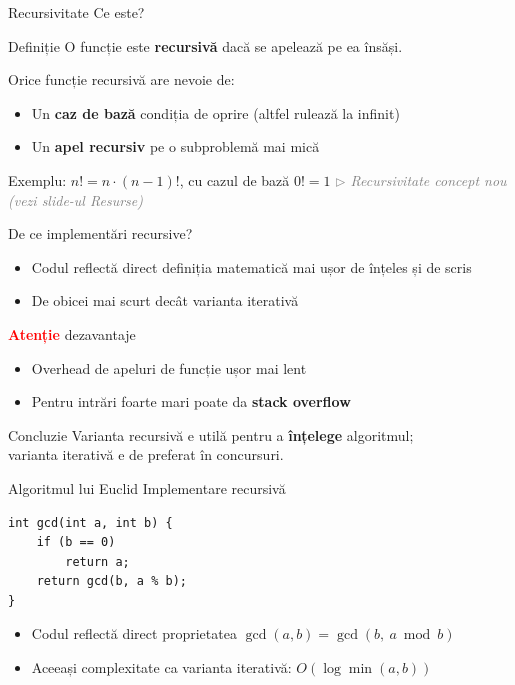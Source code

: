 ﻿\documentclass{beamer}
\newcommand{\beginnote}[1]{%
  \vfill
  {\footnotesize\textcolor{gray}{\textit{$\triangleright$ #1 (vezi slide-ul \emph{Resurse})}}}%
}
\begin{document}
\begin{frame}{Recursivitate \textemdash{} Ce este?}
  \begin{block}{Definiție}
    O funcție este \textbf{recursivă} dacă se apelează pe ea însăși.
  \end{block}
  \bigskip
  Orice funcție recursivă are nevoie de:
  \begin{itemize}
    \item Un \textbf{caz de bază} \textemdash{} condiția de oprire (altfel rulează la infinit)
    \item Un \textbf{apel recursiv} pe o subproblemă mai mică
  \end{itemize}
  \bigskip
  Exemplu: $n! = n \cdot (n-1)!$, cu cazul de bază $0! = 1$
  \beginnote{Recursivitate \textemdash{} concept nou}
\end{frame}

\begin{frame}{De ce implementări recursive?}
  \begin{itemize}
    \item Codul reflectă direct definiția matematică \textemdash{} mai ușor de înțeles și de scris
    \item De obicei mai scurt decât varianta iterativă
  \end{itemize}
  \medskip
  \begin{block}{\textbf{\textcolor{red}{Atenție}} \textemdash{} dezavantaje}
    \begin{itemize}
      \item Overhead de apeluri de funcție \textemdash{} ușor mai lent
      \item Pentru intrări foarte mari poate da \textbf{stack overflow}
    \end{itemize}
  \end{block}
  \medskip
  \begin{block}{Concluzie}
    Varianta recursivă e utilă pentru a \textbf{înțelege} algoritmul; \\ varianta iterativă e de preferat în concursuri.
  \end{block}
\end{frame}

\begin{frame}{Algoritmul lui Euclid \textemdash{} Implementare recursivă}
  \begin{center}
  \begin{lstlisting}
int gcd(int a, int b) {
    if (b == 0)
        return a;
    return gcd(b, a % b);
}
  \end{lstlisting}
  \end{center}
  \bigskip
  \begin{itemize}
    \item Codul reflectă direct proprietatea $\gcd(a, b) = \gcd(b,\ a \bmod b)$
    \item Aceeași complexitate ca varianta iterativă: $O(\log \min(a, b))$
  \end{itemize}
\end{frame}
\end{document}
